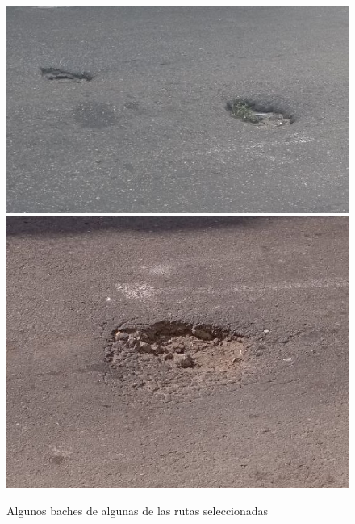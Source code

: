 \begin{appendices}
		\begin{figure}[htb]
			\centering
			\includegraphics[scale = 0.3]{Graphics/pothole_7.jpg}
			\includegraphics[scale = 0.3]{Graphics/pothole_8.jpg}
			\caption{Algunos baches de algunas de las rutas seleccionadas}
			\label{fig:17}
		\end{figure}


\end{appendices}
